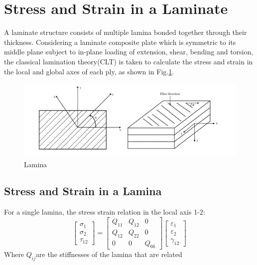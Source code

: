 \documentclass[USenglish]{article}
\begin{document}
\section{Stress and Strain in a Laminate}
A laminate structure consists of multiple lamina bonded together through their thickness.
Considering a laminate composite plate which is symmetric to its middle plane subject to in-plane
loading of extension, shear, bending and torsion, the classical lamination theory(CLT) is taken to
calculate the stress and strain in the local and global axes of each ply, as shown in 
Fig.\ref{fig:lamina}.


\begin{figure}
	\centering
	\includegraphics[width=\linewidth]{A_laminate_design_images/lamina_local_global_axes.png}
	\caption{Lamina}
  	\label{fig:lamina}
\end{figure}



\subsection{Stress and Strain in a Lamina}
For a single lamina, the stress strain relation in the local axis 1-2:
\begin{equation}
    \begin{bmatrix}
        \sigma _1\\
        \sigma _2\\
        \tau_{12}
    \end{bmatrix}
    =
    \begin{bmatrix}
        Q_{11} & Q_{12} & 0\\
        Q_{12} & Q_{22} & 0\\
        0      &  0     & Q_{66}
    \end{bmatrix}
    \begin{bmatrix}
        \varepsilon_1\\
        \varepsilon_2\\\gamma_{12}
    \end{bmatrix}
\end{equation}
Where $Q_{ij} $are the stiffnesses of the lamina that are related
\end{document}
